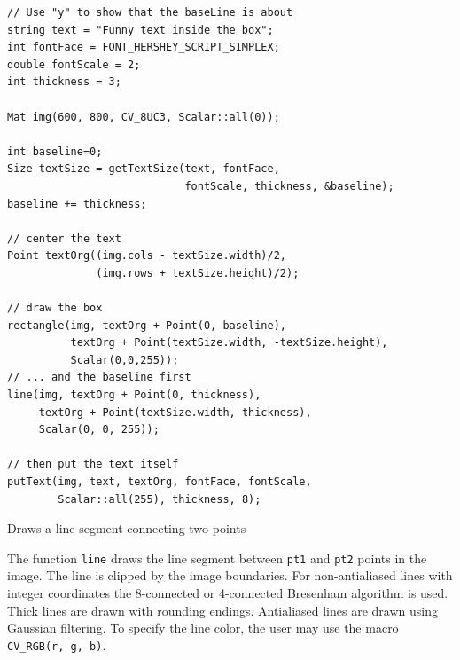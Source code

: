 \begin{lstlisting}
// Use "y" to show that the baseLine is about
string text = "Funny text inside the box";
int fontFace = FONT_HERSHEY_SCRIPT_SIMPLEX;
double fontScale = 2;
int thickness = 3;

Mat img(600, 800, CV_8UC3, Scalar::all(0));

int baseline=0;
Size textSize = getTextSize(text, fontFace,
                            fontScale, thickness, &baseline);
baseline += thickness;

// center the text
Point textOrg((img.cols - textSize.width)/2,
              (img.rows + textSize.height)/2);

// draw the box
rectangle(img, textOrg + Point(0, baseline),
          textOrg + Point(textSize.width, -textSize.height),
          Scalar(0,0,255));
// ... and the baseline first
line(img, textOrg + Point(0, thickness),
     textOrg + Point(textSize.width, thickness),
     Scalar(0, 0, 255));

// then put the text itself
putText(img, text, textOrg, fontFace, fontScale,
        Scalar::all(255), thickness, 8);
\end{lstlisting}
        
        
Draws a line segment connecting two points

\begin{description}
\end{description}

The function \texttt{line} draws the line segment between
\texttt{pt1} and \texttt{pt2} points in the image. The line is
clipped by the image boundaries. For non-antialiased lines
with integer coordinates the 8-connected or 4-connected Bresenham
algorithm is used. Thick lines are drawn with rounding endings.
Antialiased lines are drawn using Gaussian filtering. To specify
the line color, the user may use the macro
\texttt{CV\_RGB(r, g, b)}.


